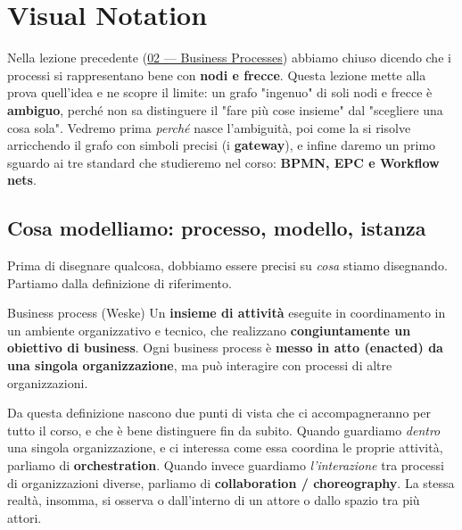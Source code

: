 \chapter{\texorpdfstring{Visual Notation}{Visual Notation}}
\label{ch:03}

Nella lezione precedente (\hyperref[ch:02]{02 — Business Processes}) abbiamo chiuso dicendo che i processi si rappresentano bene con \textbf{nodi e frecce}. Questa lezione mette alla prova quell'idea e ne scopre il limite: un grafo "ingenuo" di soli nodi e frecce è \textbf{ambiguo}, perché non sa distinguere il "fare più cose insieme" dal "scegliere una cosa sola". Vedremo prima \emph{perché} nasce l'ambiguità, poi come la si risolve arricchendo il grafo con simboli precisi (i \textbf{gateway}), e infine daremo un primo sguardo ai tre standard che studieremo nel corso: \textbf{BPMN, EPC e Workflow nets}.

\section{\texorpdfstring{Cosa modelliamo: processo, modello, istanza}{Cosa modelliamo: processo, modello, istanza}}

Prima di disegnare qualcosa, dobbiamo essere precisi su \emph{cosa} stiamo disegnando. Partiamo dalla definizione di riferimento.

\begin{boxdefinition}{Business process (Weske)}
Un \textbf{insieme di attività} eseguite in coordinamento in un ambiente organizzativo e tecnico, che realizzano \textbf{congiuntamente un obiettivo di business}. Ogni business process è \textbf{messo in atto (enacted) da una singola organizzazione}, ma può interagire con processi di altre organizzazioni.
\end{boxdefinition}

Da questa definizione nascono due punti di vista che ci accompagneranno per tutto il corso, e che è bene distinguere fin da subito. Quando guardiamo \emph{dentro} una singola organizzazione, e ci interessa come essa coordina le proprie attività, parliamo di \textbf{orchestration}. Quando invece guardiamo \emph{l'interazione} tra processi di organizzazioni diverse, parliamo di \textbf{collaboration / choreography}. La stessa realtà, insomma, si osserva o dall'interno di un attore o dallo spazio tra più attori.

